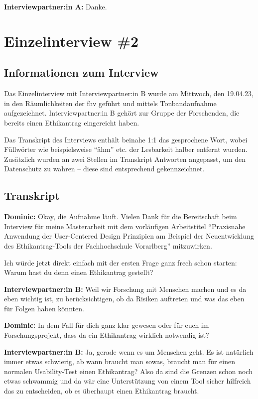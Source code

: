 \documentclass[a4paper,12pt,twoside]{scrreprt}
\begin{document}
\textbf{Interviewpartner:in A:} Danke.

\cleardoublepage
\chapter{Einzelinterview \#2}
\label{appendix:interview-2}

\section{Informationen zum Interview}
\label{appendix:interview-2-infos}

Das Einzelinterview mit Interviewpartner:in B wurde am Mittwoch, den 19.04.23, in den Räumlichkeiten der \ac{fhv} geführt und mittels Tonbandaufnahme aufgezeichnet. Interviewpartner:in B gehört zur Gruppe der Forschenden, die bereits einen Ethikantrag eingereicht haben.

Das Transkript des Interviews enthält beinahe 1:1 das gesprochene Wort, wobei Füllwörter wie beispielsweise \enquote{ähm} etc. der Lesbarkeit halber entfernt wurden. Zusätzlich wurden an zwei Stellen im Transkript Antworten angepasst, um den Datenschutz zu wahren -- diese sind entsprechend gekennzeichnet.

\section{Transkript}
\label{appendix:interview-2-transkript}

\textbf{Dominic:} Okay, die Aufnahme läuft. Vielen Dank für die Bereitschaft beim Interview für meine Masterarbeit mit dem vorläufigen Arbeitstitel \enquote{Praxisnahe Anwendung der User-Centered Design Prinzipien am Beispiel der Neuentwicklung des Ethikantrag-Tools der Fachhochschule Vorarlberg} mitzuwirken.

Ich würde jetzt direkt einfach mit der ersten Frage ganz frech schon starten: Warum hast du denn einen Ethikantrag gestellt?

\textbf{Interviewpartner:in B:} Weil wir Forschung mit Menschen machen und es da eben wichtig ist, zu berücksichtigen, ob da Risiken auftreten und was das eben für Folgen haben könnten.

\textbf{Dominic:} In dem Fall für dich ganz klar gewesen oder für euch im Forschungsprojekt, dass da ein Ethikantrag wirklich notwendig ist?

\textbf{Interviewpartner:in B:} Ja, gerade wenn es um Menschen geht. Es ist natürlich immer etwas schwierig, ab wann braucht man sowas, braucht man für einen normalen Usability-Test einen Ethikantrag? Also da sind die Grenzen schon noch etwas schwammig und da wär eine Unterstützung von einem Tool sicher hilfreich das zu entscheiden, ob es überhaupt einen Ethikantrag braucht.
\end{document}
